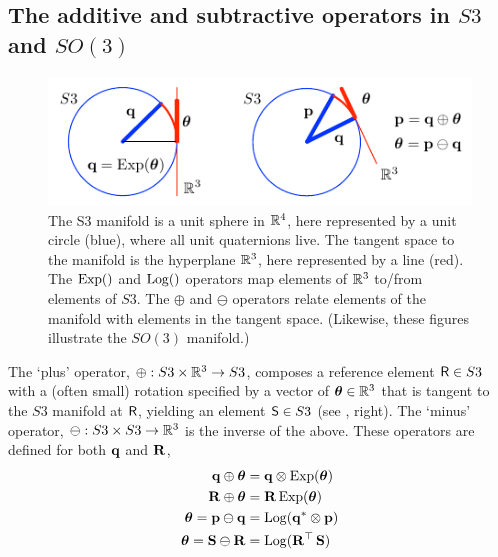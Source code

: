 


\subsection{The additive and subtractive operators in $S3$ and $SO(3)$}

\begin{figure}[tb]
\centering
\includegraphics{figures/manifold}
\caption{The S3 manifold is a unit sphere in ${\mathbb R}^4$, here represented by a unit circle (blue),  where all unit quaternions live. The tangent space to the manifold is the hyperplane ${\mathbb R}^3$, here represented by a line (red). The $\operatorname*{Exp}()$ and $\operatorname*{Log}()$ operators map elements of ${\mathbb R}^3$ to/from elements of $S3$. The $\oplus$ and $\ominus$ operators relate elements of the manifold with elements in the tangent space. (Likewise, these figures illustrate the $SO(3)$ manifold.)}
\label{fig:manifold}
\end{figure}




The `plus' operator, $\oplus:S3\times{\mathbb R}^3\to S3$, composes a reference element $\mathsf R\in S3$ with a (often small) rotation specified by a vector of ${{\bm \theta}}\in{\mathbb R}^3$ that is tangent to the $S3$ manifold at $\mathsf R$, yielding an element $\mathsf S\in S3$ (see , right). 
%
%
The `minus' operator, $\ominus:S3\times S3\to{\mathbb R}^3$ is the inverse of the above.
%
%
These operators are defined for both ${\bf q}$ and ${\bf R}$,
%
\begin{align}
{\bf q}\oplus{{\bm \theta}}  &= {\bf q}\otimes\operatorname*{Exp}({{\bm \theta}}) \label{equ:plus_q} \\
{\bf R}\oplus {{\bm \theta}} &= {\bf R}\operatorname*{Exp}({{\bm \theta}}) \label{equ:plus_R} \\
{{\bm \theta}} = {\bf p}\ominus{\bf q} &= \operatorname*{Log}({\bf q}^*\otimes{\bf p}) \label{equ:minus_q}\\
{{\bm \theta}} = {\bf S}\ominus{\bf R} &= \operatorname*{Log}({\bf R}^{\top}\,{\bf S})  \label{equ:minus_R}                       
\end{align}


